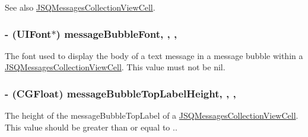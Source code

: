 \begin{DoxySeeAlso}{See also}
\hyperlink{interface_j_s_q_messages_collection_view_cell}{J\+S\+Q\+Messages\+Collection\+View\+Cell}. 
\end{DoxySeeAlso}
\hypertarget{interface_j_s_q_messages_collection_view_layout_attributes_a6bfdf3b5bf176f498a8e2656dda32065}{}
\subsubsection[{message\+Bubble\+Font}]{\setlength{\rightskip}{0pt plus 5cm}-\/ (U\+I\+Font$\ast$) message\+Bubble\+Font\hspace{0.3cm}{\ttfamily [read]}, {\ttfamily [write]}, {\ttfamily [nonatomic]}, {\ttfamily [strong]}}\label{interface_j_s_q_messages_collection_view_layout_attributes_a6bfdf3b5bf176f498a8e2656dda32065}
The font used to display the body of a text message in a message bubble within a {\ttfamily \hyperlink{interface_j_s_q_messages_collection_view_cell}{J\+S\+Q\+Messages\+Collection\+View\+Cell}}. This value must not be {\ttfamily nil}. \hypertarget{interface_j_s_q_messages_collection_view_layout_attributes_aa7cac487efd2cd332c50a33473110fe5}{}
\subsubsection[{message\+Bubble\+Top\+Label\+Height}]{\setlength{\rightskip}{0pt plus 5cm}-\/ (C\+G\+Float) message\+Bubble\+Top\+Label\+Height\hspace{0.3cm}{\ttfamily [read]}, {\ttfamily [write]}, {\ttfamily [nonatomic]}, {\ttfamily [assign]}}\label{interface_j_s_q_messages_collection_view_layout_attributes_aa7cac487efd2cd332c50a33473110fe5}
The height of the {\ttfamily message\+Bubble\+Top\+Label} of a {\ttfamily \hyperlink{interface_j_s_q_messages_collection_view_cell}{J\+S\+Q\+Messages\+Collection\+View\+Cell}}. This value should be greater than or equal to {.}.

